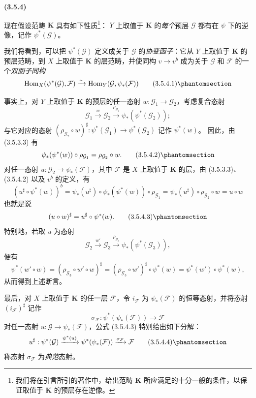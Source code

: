 \documentclass[UTF8,fontset=none,11pt,oneside,openany]{ctexbook}
\newenvironment{env}[1][]{%
  \par\medskip\noindent\textbf{(#1)}\ %
}{\par}
\newcommand{\oldpage}[2][]{%
  \hypertarget{ega-source-page-#1-#2}{}%
  \marginnote{\scriptsize\textbf{#1}~|~#2}\ignorespaces}
\let\EGAOriginalLabel\label
\renewcommand{\label}[1]{\phantomsection\EGAOriginalLabel{#1}}
\begin{document}
\oldpage[0\textsubscript{I}]{32}

\begin{env}[3.5.4]
\label{0.3.5.4-fr}
现在假设范畴 $\mathbf{K}$ 具有如下性质\footnote{我们将在引言所引的著作中，给出范畴 $\mathbf{K}$ 所应满足的十分一般的条件，以保证取值于 $\mathbf{K}$ 的预层存在逆像。}：
$Y$ 上取值于 $\mathbf{K}$ 的\emph{每个}预层 $\mathcal{G}$ 都有在
$\psi$ 下的逆像，记作 $\psi^*(\mathcal{G})$。

我们将看到，可以把 $\psi^*(\mathcal{G})$ 定义成关于
$\mathcal{G}$ 的\emph{协变函子}：它从 $Y$ 上取值于 $\mathbf{K}$ 的预层范畴，到
$X$ 上取值于 $\mathbf{K}$ 的层范畴，并使同构 $v\to v^b$ 成为关于
$\mathcal{G}$ 和 $\mathcal{F}$ 的一个\emph{双函子同构}
\begin{equation*}
  \operatorname{Hom}_X(\psi^*(\mathcal{G}),\mathcal{F})
  \xrightarrow{\sim}
  \operatorname{Hom}_Y(\mathcal{G},\psi_*(\mathcal{F}))
\tag{3.5.4.1}\label{0.3.5.4.1-fr}
\end{equation*}

事实上，对 $Y$ 上取值于 $\mathbf{K}$ 的预层的任一态射
$w:\mathcal{G}_1\to\mathcal{G}_2$，考虑复合态射
\[
  \mathcal{G}_1\xrightarrow{w}\mathcal{G}_2
  \xrightarrow{\rho_{\mathcal{G}_2}}
  \psi_*(\psi^*(\mathcal{G}_2));
\]
与它对应的态射
$(\rho_{\mathcal{G}_2}\circ w)^\sharp:
\psi^*(\mathcal{G}_1)\to\psi^*(\mathcal{G}_2)$ 记作 $\psi^*(w)$。
因此，由 (3.5.3.3) 有
\begin{equation*}
  \psi_*(\psi^*(w))\circ\rho_{\mathcal{G}_1}
  =\rho_{\mathcal{G}_2}\circ w.
\tag{3.5.4.2}\label{0.3.5.4.2-fr}
\end{equation*}
对任一态射 $u:\mathcal{G}_2\to\psi_*(\mathcal{F})$，其中
$\mathcal{F}$ 是 $X$ 上取值于 $\mathbf{K}$ 的层，由 (3.5.3.3)、
(3.5.4.2) 以及 $v^b$ 的定义，有
\[
  (u^\sharp\circ\psi^*(w))^b
  =\psi_*(u^\sharp)\circ\psi_*(\psi^*(w))\circ\rho_{\mathcal{G}_1}
  =\psi_*(u^\sharp)\circ\rho_{\mathcal{G}_2}\circ w
  =u\circ w
\]
也就是说
\begin{equation*}
  (u\circ w)^\sharp=u^\sharp\circ\psi^*(w).
\tag{3.5.4.3}\label{0.3.5.4.3-fr}
\end{equation*}
特别地，若取 $u$ 为态射
\[
  \mathcal{G}_2\xrightarrow{w'}\mathcal{G}_3
  \xrightarrow{\rho_{\mathcal{G}_3}}
  \psi_*(\psi^*(\mathcal{G}_3)),
\]
便有
\[
  \psi^*(w'\circ w)
  =(\rho_{\mathcal{G}_3}\circ w'\circ w)^\sharp
  =(\rho_{\mathcal{G}_3}\circ w')^\sharp\circ\psi^*(w)
  =\psi^*(w')\circ\psi^*(w),
\]
从而得到上述断言。

最后，对 $X$ 上取值于 $\mathbf{K}$ 的任一层 $\mathcal{F}$，令
$i_{\mathcal{F}}$ 为 $\psi_*(\mathcal{F})$ 的恒等态射，并将态射
$(i_{\mathcal{F}})^\sharp$ 记作
\[
  \sigma_{\mathcal{F}}:
  \psi^*(\psi_*(\mathcal{F}))\to\mathcal{F}
\]
对任一态射 $u:\mathcal{G}\to\psi_*(\mathcal{F})$，公式 (3.5.4.3)
特别给出如下分解：
\begin{equation*}
  u^\sharp:\psi^*(\mathcal{G})
  \xrightarrow{\psi^*(u)}
  \psi^*(\psi_*(\mathcal{F}))
  \xrightarrow{\sigma_{\mathcal{F}}}\mathcal{F}
\tag{3.5.4.4}\label{0.3.5.4.4-fr}
\end{equation*}
称态射 $\sigma_{\mathcal{F}}$ 为\emph{典范}态射。
\end{env}
\end{document}
